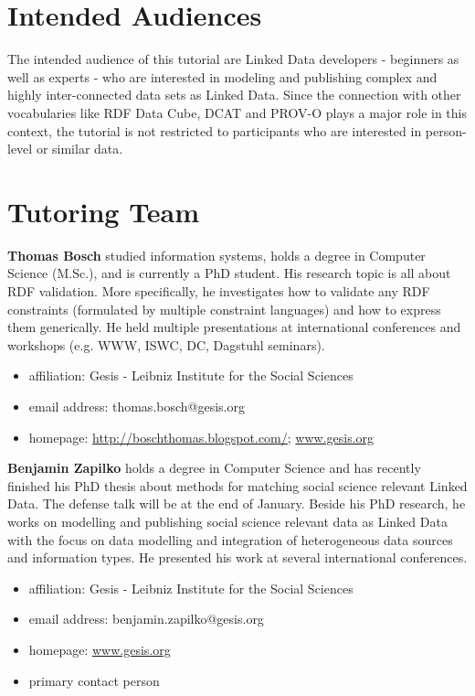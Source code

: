 \documentclass{llncs}
\begin{document}
\section{Intended Audiences}
The intended audience of this tutorial are Linked Data developers - beginners as well as experts - who are interested in modeling and publishing complex and highly inter-connected data sets as Linked Data. Since the connection with other vocabularies like RDF Data Cube, DCAT and PROV-O plays a major role in this context, the tutorial is not restricted to participants who are interested in person-level or similar data.

\section{Tutoring Team}


\textbf{Thomas Bosch} studied information systems, holds a degree in Computer Science (M.Sc.), and is currently a PhD student.
His research topic is all about RDF validation.
More specifically, he investigates how to validate any RDF constraints (formulated by multiple constraint languages) and how to express them generically. 
He held multiple presentations at international conferences and workshops (e.g. WWW, ISWC, DC, Dagstuhl seminars). 

\begin{itemize}
  \item affiliation: Gesis - Leibniz Institute for the Social Sciences
  \item email address: thomas.bosch@gesis.org
	\item homepage: \url{http://boschthomas.blogspot.com/}; \url{www.gesis.org}
\end{itemize}

\textbf{Benjamin Zapilko} holds a degree in Computer Science and has recently finished his PhD thesis about methods for matching social science relevant Linked Data. The defense talk will be at the end of January. Beside his PhD research, he works on modelling and publishing social science relevant data as Linked Data with the focus on data modelling and integration of heterogeneous data sources and information types. He presented his work at several international conferences.

\begin{itemize}
  \item affiliation: Gesis - Leibniz Institute for the Social Sciences
  \item email address: benjamin.zapilko@gesis.org
	\item homepage: \url{www.gesis.org}
	\item primary contact person
\end{itemize}
\end{document}
